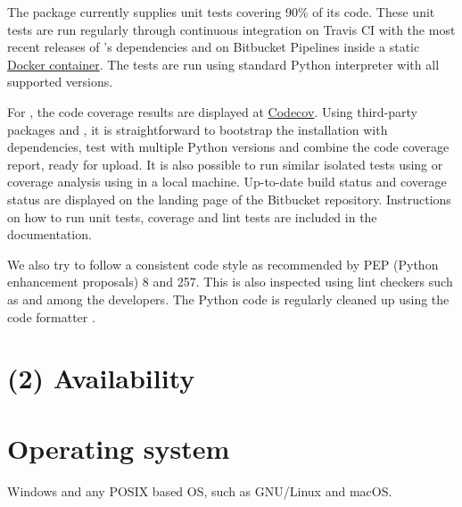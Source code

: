 \documentclass{../jors}
\begin{document}

The package  currently supplies unit tests covering 90\% of its
code.  These unit tests are run regularly through continuous integration on Travis
CI with the most recent releases of 's dependencies and on
Bitbucket Pipelines inside a static
\href{https://hub.docker.com/u/fluiddyn}{Docker container}.  The tests are run
using standard Python interpreter with all supported versions.

For , the code coverage results are displayed at
\href{https://codecov.io/bb/fluiddyn/fluidfft}{Codecov}.  Using third-party
packages  and , it is straightforward to bootstrap the
installation with dependencies, test with multiple Python versions and combine the
code coverage report, ready for upload. It is also possible to run similar
isolated tests using  or coverage analysis using  in a
local machine.  Up-to-date build status and coverage status are displayed on the
landing page of the Bitbucket repository.  Instructions on how to run unit tests,
coverage and lint tests are included in the documentation.

We also try to follow a consistent code style as recommended by PEP (Python
enhancement proposals) 8 and 257. This is also inspected using lint checkers such
as  and  among the developers.  The Python
code is regularly cleaned up using the code formatter .


\section*{(2) Availability}
\vspace{0.5cm}
\section*{Operating system}


Windows and any POSIX based OS, such as GNU/Linux and macOS.
\end{document}
